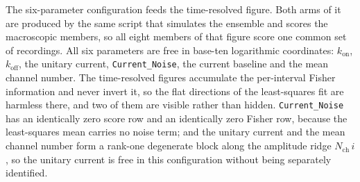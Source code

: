 
The six-parameter configuration feeds the time-resolved figure. Both
arms of it are produced by the same script that simulates the ensemble and scores the
macroscopic members, so all eight members of that figure score one common set of recordings.
All six parameters are free in base-ten logarithmic coordinates:
$k_{\mathrm{on}}$, $k_{\mathrm{off}}$, the unitary current, \texttt{Current\_Noise},
the current baseline and the mean channel number.
The time-resolved figures accumulate the per-interval Fisher information and never invert it,
so the flat directions of the least-squares fit are harmless there, and two of them are visible
rather than hidden.
\texttt{Current\_Noise} has an identically zero score row and an
identically zero Fisher row, because the least-squares mean carries no noise term; and
the unitary current and the mean channel number form a rank-one degenerate block along
the amplitude ridge $N_{\mathrm{ch}}\,i$, so the unitary current is free in this
configuration without being separately identified.

